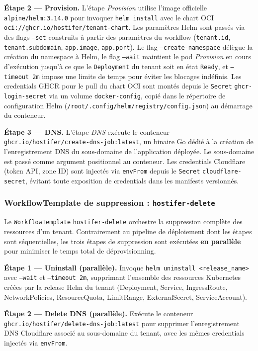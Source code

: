 \textbf{Étape 2 — Provision.} L'étape \textit{Provision} utilise l'image officielle \texttt{alpine/helm:3.14.0} pour invoquer \texttt{helm install} avec le chart OCI \texttt{oci://ghcr.io/hostifer/tenant-chart}. Les paramètres Helm sont passés via des flags \texttt{--set} construits à partir des paramètres du workflow (\texttt{tenant.id}, \texttt{tenant.subdomain}, \texttt{app.image}, \texttt{app.port}). Le flag \texttt{--create-namespace} délègue la création du namespace à Helm, le flag \texttt{--wait} maintient le pod \textit{Provision} en cours d'exécution jusqu'à ce que le \texttt{Deployment} du tenant soit en état \texttt{Ready}, et \texttt{--timeout 2m} impose une limite de temps pour éviter les blocages indéfinis. Les credentials GHCR pour le pull du chart OCI sont montés depuis le \texttt{Secret} \texttt{ghcr-login-secret} via un volume \texttt{docker-config}, copié dans le répertoire de configuration Helm (\texttt{/root/.config/helm/registry/config.json}) au démarrage du conteneur.

\textbf{Étape 3 — DNS.} L'étape \textit{DNS} exécute le conteneur \texttt{ghcr.io/hostifer/create-dns-job:latest}, un binaire Go dédié à la création de l'enregistrement DNS du sous-domaine de l'application déployée. Le sous-domaine est passé comme argument positionnel au conteneur. Les credentials Cloudflare (token API, zone ID) sont injectés via \texttt{envFrom} depuis le \texttt{Secret} \texttt{cloudflare-secret}, évitant toute exposition de credentials dans les manifests versionnés.

\subsubsection*{WorkflowTemplate de suppression : \texttt{hostifer-delete}}

Le \texttt{WorkflowTemplate} \texttt{hostifer-delete} orchestre la suppression complète des ressources d'un tenant. Contrairement au pipeline de déploiement dont les étapes sont séquentielles, les trois étapes de suppression sont exécutées \textbf{en parallèle} pour minimiser le temps total de déprovisionning.

\textbf{Étape 1 — Uninstall (parallèle).} Invoque \texttt{helm uninstall <release\_name>} avec \texttt{--wait} et \texttt{--timeout 2m}, supprimant l'ensemble des ressources Kubernetes créées par la release Helm du tenant (Deployment, Service, IngressRoute, NetworkPolicies, ResourceQuota, LimitRange, ExternalSecret, ServiceAccount).

\textbf{Étape 2 — Delete DNS (parallèle).} Exécute le conteneur \texttt{ghcr.io/hostifer/delete-dns-job:latest} pour supprimer l'enregistrement DNS Cloudflare associé au sous-domaine du tenant, avec les mêmes credentials injectés via \texttt{envFrom}.

